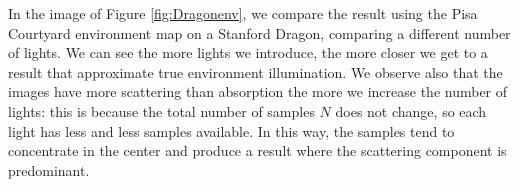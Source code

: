 \clearpage
In the image of Figure \ref{fig:Dragonenv}, we compare the result using the Pisa Courtyard environment map on a Stanford Dragon, comparing a different number of lights. We can see the more lights we introduce, the more closer we get to a result that approximate true environment illumination. We observe also that the images have more scattering than absorption the more we increase the number of lights: this is because the total number of samples $N$ does not change, so each light has less and less samples available. In this way, the samples tend to concentrate in the center and produce a result where the scattering component is predominant.
\begin{figure}[!h]
\vspace{-0.5cm}
\centering
{}
 \\


\end{figure}
